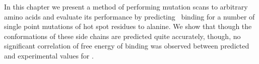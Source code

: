 In this chapter we present a method of performing mutation scans to arbitrary amino acids and evaluate its performance by predicting \ddg\ binding for a number of single point mutations of hot spot residues to alanine.
We show that though the conformations of these side chains are predicted quite accurately, though, no significant correlation of free energy of binding was observed between predicted and experimental values for \ddg.


